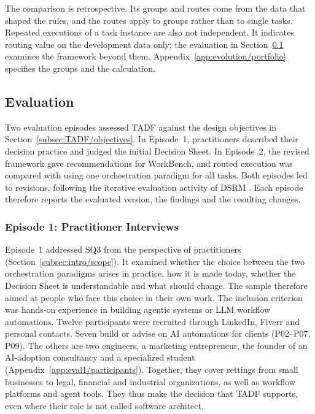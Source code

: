 The comparison is retrospective. Its groups and routes come from the data that shaped the rules, and the routes apply to groups rather than to single tasks. Repeated executions of a task instance are also not independent. It indicates routing value on the development data only; the evaluation in Section~\ref{subsec:TADF/evaluation} examines the framework beyond them. Appendix~\ref{app:evolution/portfolio} specifies the groups and the calculation.
\FloatBarrier

\subsection{Evaluation}
\label{subsec:TADF/evaluation}
Two evaluation episodes assessed TADF against the design objectives in Section~\ref{subsec:TADF/objectives}. In Episode~1, practitioners described their decision practice and judged the initial Decision Sheet. In Episode~2, the revised framework gave recommendations for WorkBench, and routed execution was compared with using one orchestration paradigm for all tasks. Both episodes led to revisions, following the iterative evaluation activity of DSRM \parencite{peffersDesignScienceResearch2007}. Each episode therefore reports the evaluated version, the findings and the resulting changes.

\subsubsection{Episode 1: Practitioner Interviews}
\label{subsubsec:TADF/episode1}
Episode~1 addressed SQ3 from the perspective of practitioners (Section~\ref{subsec:intro/scope}). It examined whether the choice between the two orchestration paradigms arises in practice, how it is made today, whether the Decision Sheet is understandable and what should change. The sample therefore aimed at people who face this choice in their own work. The inclusion criterion was hands-on experience in building agentic systems or LLM workflow automations. Twelve participants were recruited through LinkedIn, Fiverr and personal contacts. Seven build or advise on AI automations for clients (P02--P07, P09). The others are two engineers, a marketing entrepreneur, the founder of an AI-adoption consultancy and a specialized student (Appendix~\ref{app:eval1/participants}). Together, they cover settings from small businesses to legal, financial and industrial organizations, as well as workflow platforms and agent tools. They thus make the decision that TADF supports, even where their role is not called software architect.

